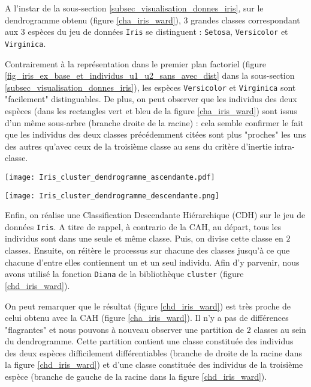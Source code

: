 \documentclass{article}
\begin{document}
\begin{multicols}{2}
A l'instar de la sous-section \ref{subsec_visualisation_donnes_iris}, sur le dendrogramme obtenu (figure \ref{cha_iris_ward}), $3$ grandes classes correspondant aux $3$ espèces du jeu de données \texttt{Iris} se distinguent : \texttt{Setosa}, \texttt{Versicolor} et \texttt{Virginica}.

Contrairement à la représentation dans le premier plan factoriel (figure \ref{fig_iris_ex_base_et_individus_u1_u2_sans_avec_dist} dans la sous-section \ref{subsec_visualisation_donnes_iris}), les espèces \texttt{Versicolor} et \texttt{Virginica} sont "facilement" distinguables. De plus, on peut observer que les individus des deux espèces (dans les rectangles vert et bleu de la figure \ref{cha_iris_ward}) sont issus d'un même sous-arbre (branche droite de la racine) : cela semble confirmer le fait que les individus des deux classes précédemment citées sont plus "proches" les uns des autres qu'avec ceux de la troisième classe au sens du critère d'inertie intra-classe. 

\begingroup
   \centering
   \texttt{[image: Iris\_cluster\_dendrogramme\_ascendante.pdf]}
    \label{cha_iris_ward}
\endgroup

\begingroup
   \centering
   \texttt{[image: Iris\_cluster\_dendrogramme\_descendante.png]}
    \label{chd_iris_ward}
\endgroup

Enfin, on réalise une Classification Descendante Hiérarchique (CDH) sur le jeu de données \texttt{Iris}. A titre de rappel, à contrario de la CAH, au départ, tous les individus sont dans une seule et même classe. Puis, on divise cette classe en $2$ classes. Ensuite, on réitère le processus sur chacune des classes jusqu'à ce que chacune d'entre elles contiennent un et un seul individu. Afin d'y parvenir, nous avons utilisé la fonction \texttt{Diana} de la bibliothèque \texttt{cluster} (figure \ref{chd_iris_ward}).

On peut remarquer que le résultat (figure \ref{chd_iris_ward}) est très proche de celui obtenu avec la CAH (figure \ref{cha_iris_ward}). Il n'y a pas de différences "flagrantes" et nous pouvons à nouveau observer une partition de $2$ classes au sein du dendrogramme. Cette partition contient une classe constituée des individus des deux espèces difficilement différentiables (branche de droite de la racine dans la figure \ref{chd_iris_ward}) et d'une classe constituée des individus de la troisième espèce (branche de gauche de la racine dans la figure \ref{chd_iris_ward}).


\end{multicols}
\end{document}
